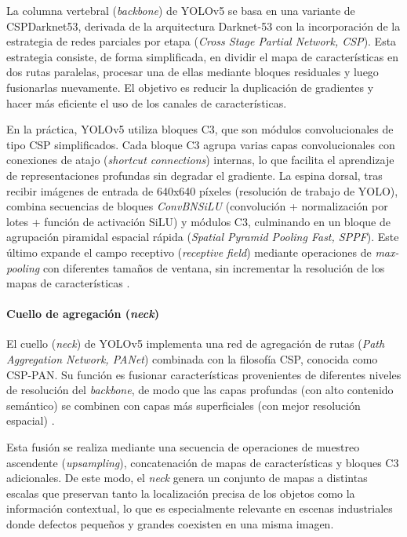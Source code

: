\par La columna vertebral (\textit{backbone}) de YOLOv5 se basa en una variante de CSPDarknet53, derivada de la arquitectura Darknet-53 con la incorporación de la estrategia de redes parciales por etapa (\textit{Cross Stage Partial Network, CSP}). Esta estrategia consiste, de forma simplificada, en dividir el mapa de características en dos rutas paralelas, procesar una de ellas mediante bloques residuales y luego fusionarlas nuevamente. El objetivo es reducir la duplicación de gradientes y hacer más eficiente el uso de los canales de características. \\

\par En la práctica, YOLOv5 utiliza bloques C3, que son módulos convolucionales de tipo CSP simplificados. Cada bloque C3 agrupa varias capas convolucionales con conexiones de atajo (\textit{shortcut connections}) internas, lo que facilita el aprendizaje de representaciones profundas sin degradar el gradiente. La espina dorsal, tras recibir imágenes de entrada de 640x640 píxeles (resolución de trabajo de YOLO), combina secuencias de bloques \textit{ConvBNSiLU} (convolución + normalización por lotes + función de activación SiLU) y módulos C3, culminando en un bloque de agrupación piramidal espacial rápida (\textit{Spatial Pyramid Pooling Fast, SPPF}). Este último expande el campo receptivo (\textit{receptive field}) mediante operaciones de \textit{max-pooling} con diferentes tamaños de ventana, sin incrementar la resolución de los mapas de características \cite{Jani2023ModelCompressionYOLOv5}. \\

\paragraph{Cuello de agregación (\textit{neck})}

\par El cuello (\textit{neck}) de YOLOv5 implementa una red de agregación de rutas (\textit{Path Aggregation Network, PANet}) combinada con la filosofía CSP, conocida como CSP-PAN. Su función es fusionar características provenientes de diferentes niveles de resolución del \textit{backbone}, de modo que las capas profundas (con alto contenido semántico) se combinen con capas más superficiales (con mejor resolución espacial) \cite{Jani2023ModelCompressionYOLOv5}. \\

\par Esta fusión se realiza mediante una secuencia de operaciones de muestreo ascendente (\textit{upsampling}), concatenación de mapas de características y bloques C3 adicionales. De este modo, el \textit{neck} genera un conjunto de mapas a distintas escalas que preservan tanto la localización precisa de los objetos como la información contextual, lo que es especialmente relevante en escenas industriales donde defectos pequeños y grandes coexisten en una misma imagen. \\

